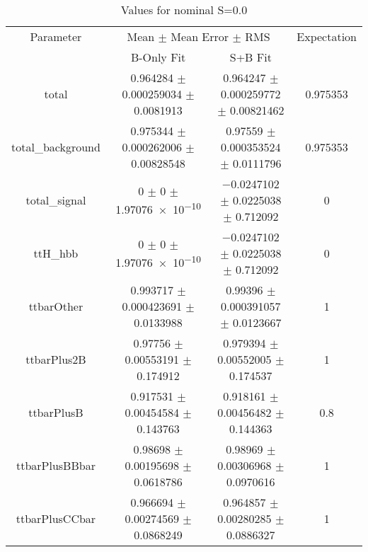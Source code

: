 \begin{table}
\centering
\caption{Values for nominal S=0.0}
\begin{tabular}{cccc}
\toprule
Parameter & \multicolumn{2}{c}{Mean $\pm$ Mean Error $\pm$ RMS} & Expectation\\
 & B-Only Fit & S+B Fit & \\
\midrule
total & \num{0.964284} $\pm$ \num{0.000259034} $\pm$ \num{0.0081913} & \num{0.964247} $\pm$ \num{0.000259772} $\pm$ \num{0.00821462} & \num{0.975353}\\
total\_background & \num{0.975344} $\pm$ \num{0.000262006} $\pm$ \num{0.00828548} & \num{0.97559} $\pm$ \num{0.000353524} $\pm$ \num{0.0111796} & \num{0.975353}\\
total\_signal & \num{0} $\pm$ \num{0} $\pm$ \num{1.97076e-10} & \num{-0.0247102} $\pm$ \num{0.0225038} $\pm$ \num{0.712092} & \num{0}\\
ttH\_hbb & \num{0} $\pm$ \num{0} $\pm$ \num{1.97076e-10} & \num{-0.0247102} $\pm$ \num{0.0225038} $\pm$ \num{0.712092} & \num{0}\\
ttbarOther & \num{0.993717} $\pm$ \num{0.000423691} $\pm$ \num{0.0133988} & \num{0.99396} $\pm$ \num{0.000391057} $\pm$ \num{0.0123667} & \num{1}\\
ttbarPlus2B & \num{0.97756} $\pm$ \num{0.00553191} $\pm$ \num{0.174912} & \num{0.979394} $\pm$ \num{0.00552005} $\pm$ \num{0.174537} & \num{1}\\
ttbarPlusB & \num{0.917531} $\pm$ \num{0.00454584} $\pm$ \num{0.143763} & \num{0.918161} $\pm$ \num{0.00456482} $\pm$ \num{0.144363} & \num{0.8}\\
ttbarPlusBBbar & \num{0.98698} $\pm$ \num{0.00195698} $\pm$ \num{0.0618786} & \num{0.98969} $\pm$ \num{0.00306968} $\pm$ \num{0.0970616} & \num{1}\\
ttbarPlusCCbar & \num{0.966694} $\pm$ \num{0.00274569} $\pm$ \num{0.0868249} & \num{0.964857} $\pm$ \num{0.00280285} $\pm$ \num{0.0886327} & \num{1}\\
\bottomrule
\end{tabular}
\end{table}